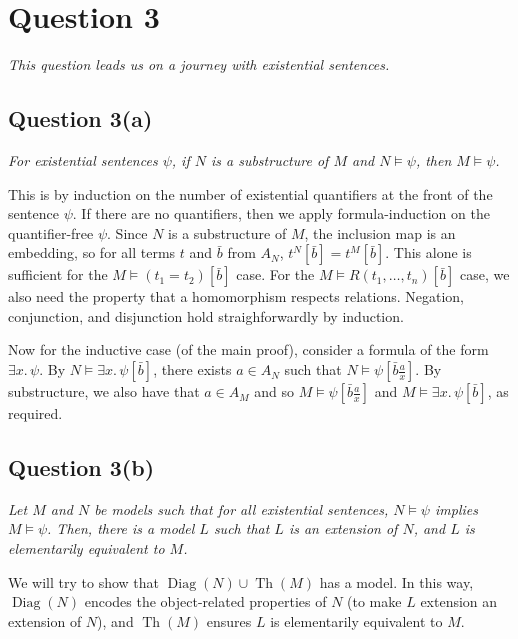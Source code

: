 \documentclass[a4paper]{article}
\DeclareMathOperator{\Diag}{Diag}
\DeclareMathOperator{\Th}{Th}
\begin{document}
\section*{Question 3}
\begin{center}
  \textit{This question leads us on a journey with existential sentences.}
\end{center}
\subsection*{Question 3(a)}
\begin{center}
  \textit{For existential sentences $\psi$, if $N$ is a substructure of $M$ and $N \models \psi$, then $M \models \psi$.}
\end{center}
This is by induction on the number of existential quantifiers at the front
of the sentence $\psi$.
If there are no quantifiers, then we apply formula-induction on the quantifier-free $\psi$.
Since $N$ is a substructure of $M$, the inclusion map is an embedding,
so
for all terms $t$ and $\bar b$ from $A_N$, $t^N[\bar b] = t^M[\bar b]$.
This alone is sufficient for the $M \models (t_1 = t_2)[\bar b]$ case.
For the $M \models R(t_1, \ldots, t_n)[\bar b]$ case, we also need the property that
a homomorphism respects relations. 
Negation, conjunction, and disjunction hold straighforwardly by induction.

Now for the inductive case (of the main proof), consider a formula of the form $\exists x.\,\psi$. 
By $N \models \exists x.\, \psi[\bar b]$, there exists $a \in A_N$
such that $N \models \psi[\bar b \frac a x]$.
By substructure, we also have that $a \in A_M$ and so
$M \models \psi[\bar b \frac a x]$ and
$M \models \exists x.\,\psi[\bar b]$,
as required.
  

\subsection*{Question 3(b)}
\begin{center}
  \textit{Let $M$ and $N$ be models such that for all existential sentences, $N \models \psi$ implies $M \models \psi$.
  Then, there is a model $L$ such that $L$ is an extension of $N$, and $L$ is elementarily equivalent to $M$.}
\end{center}
We will try to show that $\Diag(N) \cup \Th(M)$ has a model.
In this way, $\Diag(N)$ encodes the object-related properties of $N$
(to  make $L$ extension an extension of $N$),
and $\Th(M)$ ensures $L$ is elementarily equivalent to $M$.
\end{document}

